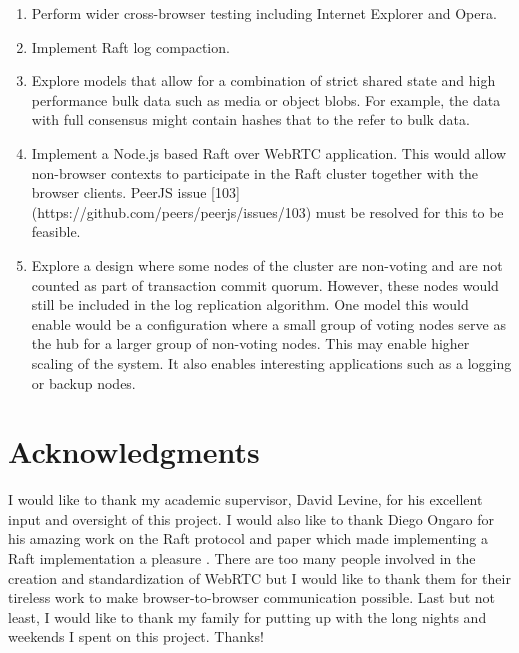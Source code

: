 \documentclass[9pt]{extarticle}
\begin{document}
\begin{multicols}{2}
\begin{enumerate}
\item Perform wider cross-browser testing including Internet Explorer and
  Opera.
\item Implement Raft log compaction.
\item Explore models that allow for a combination of strict shared state
  and high performance bulk data such as media or object blobs. For
  example, the data with full consensus might contain hashes that to
  the refer to bulk data.
\item Implement a Node.js based Raft over WebRTC application. This would
  allow non-browser contexts to participate in the Raft cluster
  together with the browser clients. PeerJS issue
  [103](https://github.com/peers/peerjs/issues/103) must be resolved
  for this to be feasible.
\item Explore a design where some nodes of the cluster are non-voting and
  are not counted as part of transaction commit quorum. However, these
  nodes would still be included in the log replication algorithm. One
  model this would enable would be a configuration where a small group
  of voting nodes serve as the hub for a larger group of non-voting
  nodes. This may enable higher scaling of the system. It also enables
  interesting applications such as a logging or backup nodes.
\end{enumerate}


\section*{Acknowledgments}
I would like to thank my academic supervisor, David Levine, for his
excellent input and oversight of this project. I would also like to
thank Diego Ongaro for his amazing work on the Raft protocol and paper
\cite[p.~215]{lamport78} which made implementing
a Raft implementation a pleasure \cite{lamport78}.
There are too many people involved in the creation and standardization
of WebRTC but I would like to thank them for their tireless work to
make browser-to-browser communication possible. Last but not least,
I would like to thank my family for putting up with the long nights
and weekends I spent on this project. Thanks!


\end{multicols}

\printbibliography
%
%
\end{document}

